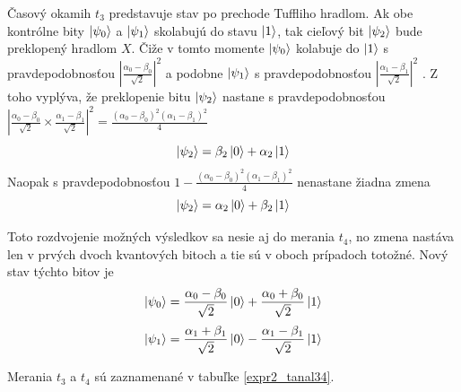 Časový okamih \(t_3\) predstavuje stav po prechode Tuffliho hradlom. Ak obe 
kontrólne bity \(\ket{\psi_0}\) a \(\ket{\psi_1}\) skolabujú do stavu 
\(\ket{1}\), tak cieľový bit \(\ket{\psi_2}\) bude preklopený hradlom \(X\).
Čiže v tomto momente \(\ket{\psi_0}\) kolabuje do \(\ket{1}\) s 
pravdepodobnosťou \(|\frac{\alpha_0 - \beta_0}{\sqrt{2}}|^2\) a podobne 
\(\ket{\psi_1}\) s pravdepodobnosťou \(|\frac{\alpha_1 - \beta_1}{\sqrt{2}}|^2\)
. Z toho vyplýva, že preklopenie bitu \(\ket{\psi_2}\) nastane
s pravdepodobnosťou  \(|\frac{\alpha_0 - \beta_0}{\sqrt{2}} \times \frac{\alpha_1 - \beta_1}{\sqrt{2}}|^2 = \frac{(\alpha_0 - \beta_0)^2(\alpha_1 - \beta_1)^2}{4}\)
\[\ket{\psi_2} = \beta_2\ket{0} + \alpha_2\ket{1}\]
Naopak s pravdepodobnosťou \(1 - \frac{(\alpha_0 - \beta_0)^2(\alpha_1 - \beta_1)^2}{4}\)
nenastane žiadna zmena
\[\ket{\psi_2} = \alpha_2\ket{0} + \beta_2\ket{1}\]

Toto rozdvojenie možných výsledkov sa nesie aj do merania \(t_4\), no zmena
nastáva len v prvých dvoch kvantových bitoch a tie sú v oboch prípadoch 
totožné. Nový stav týchto bitov je 
\[\ket{\psi_0} = \frac{\alpha_0 - \beta_0}{\sqrt{2}}\ket{0} + \frac{\alpha_0 + \beta_0}{\sqrt{2}}\ket{1}\]
\[\ket{\psi_1} = \frac{\alpha_1 + \beta_1}{\sqrt{2}}\ket{0} - \frac{\alpha_1 - \beta_1}{\sqrt{2}}\ket{1}\]

Merania \(t_3\) a \(t_4\) sú zaznamenané v tabuľke \ref{expr2_tanal34}.

